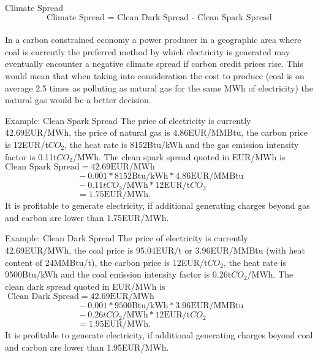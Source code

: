 
{Climate Spread}
$$\text{Climate Spread = Clean Dark Spread - Clean Spark Spread}$$\\
  \vspace{0.6cm}
In a carbon constrained economy a power producer in a geographic area where coal is currently the preferred method by which electricity is generated may eventually encounter a negative climate spread  if carbon credit prices rise. This would mean that when taking into consideration the cost to produce (coal is on average 2.5 times as polluting as natural gas for the same MWh of electricity) the natural gas would be a better decision.

{Example: Clean Spark Spread}
The price of electricity is currently 42.69EUR/MWh, the price of natural gas is 4.86EUR/MMBtu, the carbon price is 12EUR/t$CO_2$, the heat rate is 8152Btu/kWh and the gas emission intensity factor is 0.11t$CO_2$/MWh. The clean spark spread quoted in EUR/MWh is\\
$\text{Clean Spark Spread}=42.69\text{EUR/MWh}$\\
$\qquad\qquad\qquad\qquad\;\,-0.001\ast8152\text{Btu/kWh}\ast4.86\text{EUR/MMBtu}$\\
$\qquad\qquad\qquad\qquad\;\,-0.11tCO_2\text{/MWh}\ast12\text{EUR/t}CO_2$\\
$\qquad\qquad\qquad\qquad\;\,=1.75\text{EUR/MWh}.$\\
\vspace{0.2cm}
It is profitable to generate electricity, if additional generating charges beyond gas and carbon are lower than 1.75EUR/MWh.

{Example: Clean Dark Spread}
The price of electricity is currently 42.69EUR/MWh, the coal price is 95.04EUR/t or 3.96EUR/MMBtu (with heat content of 24MMBtu/t), the carbon price is 12EUR/t$CO_2$, the heat rate is 9500Btu/kWh and the coal emission intensity factor is 0.26t$CO_2$/MWh. The clean dark spread quoted in EUR/MWh is\\
$\;\text{Clean Dark Spread}=42.69\text{EUR/MWh}$\\
$\qquad\qquad\qquad\qquad\;\,-0.001\ast9500\text{Btu/kWh}\ast3.96\text{EUR/MMBtu}$\\
$\qquad\qquad\qquad\qquad\;\,-0.26tCO_2\text{/MWh}\ast12\text{EUR/t}CO_2$\\
$\qquad\qquad\qquad\qquad\;\,=1.95\text{EUR/MWh}.$\\
\vspace{0.2cm}
It is profitable to generate electricity, if additional generating charges beyond coal and carbon are lower than 1.95EUR/MWh.

